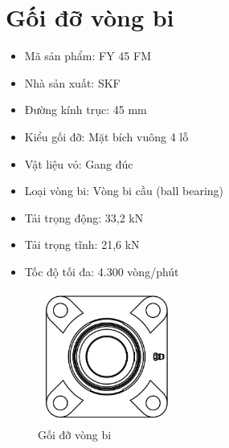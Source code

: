 \section{Gối đỡ vòng bi}
\begin{itemize}
    \item Mã sản phẩm: FY 45 FM
    \item Nhà sản xuất: SKF
    \item Đường kính trục: 45 mm
    \item Kiểu gối đỡ: Mặt bích vuông 4 lỗ
    \item Vật liệu vỏ: Gang đúc
    \item Loại vòng bi: Vòng bi cầu (ball bearing)
    \item Tải trọng động: 33,2 kN
    \item Tải trọng tĩnh: 21,6 kN
    \item Tốc độ tối đa: 4.300 vòng/phút
\end{itemize}
\begin{figure}[H]
    \centering
    \includegraphics[width=0.4\textwidth]{pictures/goi.png}
    \caption{Gối đỡ vòng bi}
\end{figure}